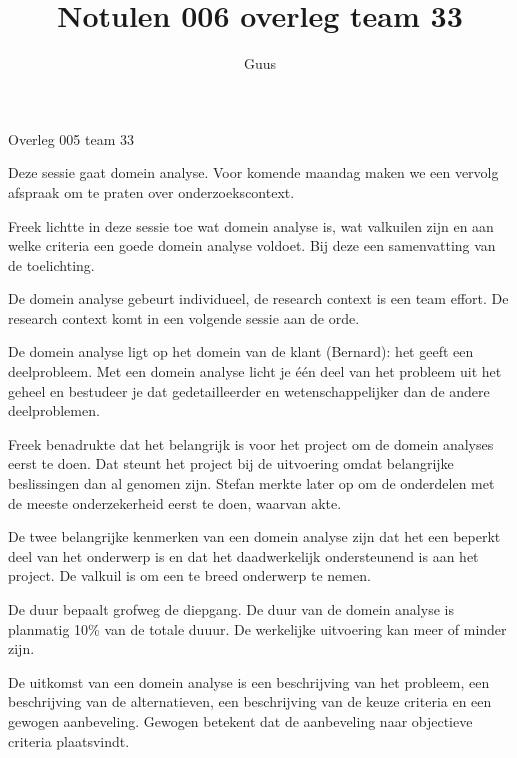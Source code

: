 \documentclass{article}
\title{Notulen 006 overleg team 33}
\author{Guus}
\begin{document}

\begin{Minutes}{Overleg 005 team 33}

\maketitle%


Deze sessie gaat domein analyse. Voor komende maandag maken we een vervolg afspraak om te praten over onderzoekscontext.


Freek lichtte in deze sessie toe wat domein analyse is, wat valkuilen zijn en aan welke criteria een goede domein analyse voldoet. Bij deze een samenvatting
van de toelichting.

De domein analyse gebeurt individueel, de research context is een team effort. De research context komt in een volgende sessie aan de orde.

De domein analyse ligt op het domein van de klant (Bernard): het geeft een deelprobleem. Met een domein analyse licht je
\'e\'en deel van het probleem uit het geheel en bestudeer je dat gedetailleerder en wetenschappelijker dan de andere deelproblemen.

Freek benadrukte dat het belangrijk is voor het project om de domein analyses eerst te doen. Dat steunt het project bij de uitvoering omdat belangrijke beslissingen
dan al genomen zijn. Stefan merkte later op om de onderdelen met de meeste onderzekerheid eerst te doen, waarvan akte.

De twee belangrijke kenmerken van een domein analyse zijn dat het een beperkt deel van het onderwerp is en dat het daadwerkelijk ondersteunend is aan het project.
De valkuil is om een te breed onderwerp te nemen.

De duur bepaalt grofweg de diepgang. De duur van de domein analyse is planmatig 10\% van de totale duuur.
De werkelijke uitvoering kan meer of minder zijn.

De uitkomst van een domein analyse is een beschrijving van het probleem,
een beschrijving van de alternatieven, een beschrijving van de keuze criteria en een gewogen aanbeveling. Gewogen betekent dat de aanbeveling naar objectieve criteria plaatsvindt.


\end{Minutes}
\end{document}

